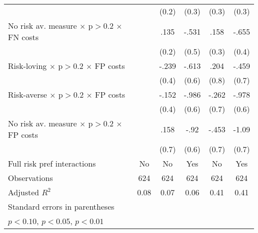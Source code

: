 \begin{table}[htbp]
\begin{tabular}{l*{5}{c}}
                &                  &    (0.2)         &    (0.3)         &    (0.3)         &    (0.3)         \\
No risk av. measure $\times$ p$>$0.2 $\times$ FN costs&                  &     .135         &    -.531         &     .158         &    -.655         \\
                &                  &    (0.2)         &    (0.5)         &    (0.3)         &    (0.4)         \\
Risk-loving $\times$ p$>$0.2 $\times$ FP costs&                  &    -.239         &    -.613         &     .204         &    -.459         \\
                &                  &    (0.4)         &    (0.6)         &    (0.8)         &    (0.7)         \\
Risk-averse $\times$ p$>$0.2 $\times$ FP costs&                  &    -.152         &    -.986         &    -.262         &    -.978         \\
                &                  &    (0.4)         &    (0.6)         &    (0.7)         &    (0.6)         \\
No risk av. measure $\times$ p$>$0.2 $\times$ FP costs&                  &     .158         &     -.92         &    -.453         &    -1.09         \\
                &                  &    (0.7)         &    (0.6)         &    (0.7)         &    (0.7)         \\
Full risk pref interactions&       No         &       No         &      Yes         &       No         &      Yes         \\
\hline
Observations    &      624         &      624         &      624         &      624         &      624         \\
Adjusted \(R^{2}\)&     0.08         &     0.07         &     0.06         &     0.41         &     0.41         \\
\hline\hline
\multicolumn{6}{l}{\footnotesize Standard errors in parentheses}\\
\multicolumn{6}{l}{\footnotesize \sym{*} \(p<0.10\), \sym{**} \(p<0.05\), \sym{***} \(p<0.01\)}\\
\end{tabular}
\end{table}
